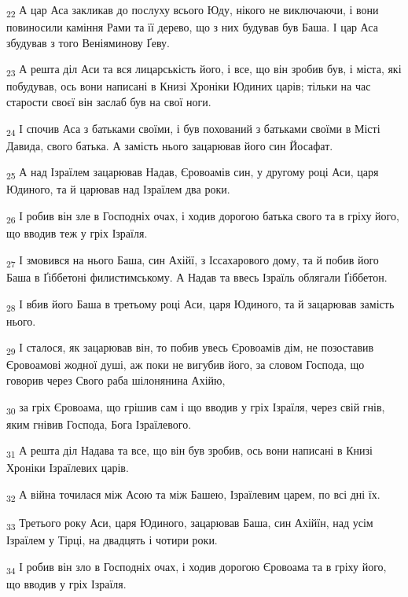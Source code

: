 \begin{tcolorbox}
\textsubscript{22} А цар Аса закликав до послуху всього Юду, нікого не виключаючи, і вони повиносили каміння Рами та її дерево, що з них будував був Баша. І цар Аса збудував з того Веніяминову Ґеву.
\end{tcolorbox}
\begin{tcolorbox}
\textsubscript{23} А решта діл Аси та вся лицарськість його, і все, що він зробив був, і міста, які побудував, ось вони написані в Книзі Хроніки Юдиних царів; тільки на час старости своєї він заслаб був на свої ноги.
\end{tcolorbox}
\begin{tcolorbox}
\textsubscript{24} І спочив Аса з батьками своїми, і був похований з батьками своїми в Місті Давида, свого батька. А замість нього зацарював його син Йосафат.
\end{tcolorbox}
\begin{tcolorbox}
\textsubscript{25} А над Ізраїлем зацарював Надав, Єровоамів син, у другому році Аси, царя Юдиного, та й царював над Ізраїлем два роки.
\end{tcolorbox}
\begin{tcolorbox}
\textsubscript{26} І робив він зле в Господніх очах, і ходив дорогою батька свого та в гріху його, що вводив теж у гріх Ізраїля.
\end{tcolorbox}
\begin{tcolorbox}
\textsubscript{27} І змовився на нього Баша, син Ахійї, з Іссахарового дому, та й побив його Баша в Ґіббетоні филистимському. А Надав та ввесь Ізраїль облягали Ґіббетон.
\end{tcolorbox}
\begin{tcolorbox}
\textsubscript{28} І вбив його Баша в третьому році Аси, царя Юдиного, та й зацарював замість нього.
\end{tcolorbox}
\begin{tcolorbox}
\textsubscript{29} І сталося, як зацарював він, то побив увесь Єровоамів дім, не позоставив Єровоамові жодної душі, аж поки не вигубив його, за словом Господа, що говорив через Свого раба шілонянина Ахійю,
\end{tcolorbox}
\begin{tcolorbox}
\textsubscript{30} за гріх Єровоама, що грішив сам і що вводив у гріх Ізраїля, через свій гнів, яким гнівив Господа, Бога Ізраїлевого.
\end{tcolorbox}
\begin{tcolorbox}
\textsubscript{31} А решта діл Надава та все, що він був зробив, ось вони написані в Книзі Хроніки Ізраїлевих царів.
\end{tcolorbox}
\begin{tcolorbox}
\textsubscript{32} А війна точилася між Асою та між Башею, Ізраїлевим царем, по всі дні їх.
\end{tcolorbox}
\begin{tcolorbox}
\textsubscript{33} Третього року Аси, царя Юдиного, зацарював Баша, син Ахійїн, над усім Ізраїлем у Тірці, на двадцять і чотири роки.
\end{tcolorbox}
\begin{tcolorbox}
\textsubscript{34} І робив він зло в Господніх очах, і ходив дорогою Єровоама та в гріху його, що вводив у гріх Ізраїля.
\end{tcolorbox}
